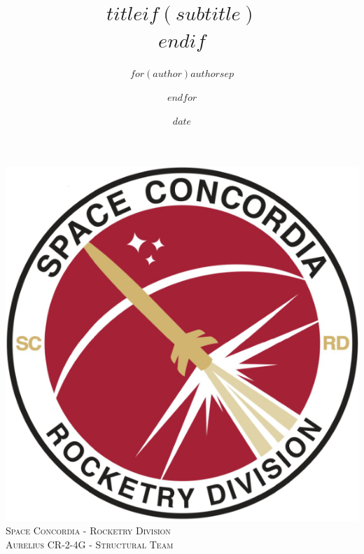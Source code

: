\documentclass[$if(fontsize)$$fontsize$,$endif$$if(lang)$$lang$,$endif$$if(papersize)$$papersize$,$endif$$for(classoption)$$classoption$$sep$,$endfor$]{$documentclass$}
\title{$title$$if(subtitle)$\\\vspace{0.5em}{\large $subtitle$}$endif$}
\author{$for(author)$$author$$sep$ \and $endfor$}
\date{$date$}
\begin{document}
%
%
\begin{titlepage}

\newcommand{\HRule}{\rule{\linewidth}{0.5mm}} %

\center %
 

\includegraphics[scale=0.5]{../images/rocketry_logo_large.png}\\[1cm] %
\textsc{\Large Space Concordia - Rocketry Division}\\[0.5cm] %
\textsc{\large Aurelius CR-2-4G - Structural Team}\\[0.5cm] %



\end{titlepage}
\end{document}
